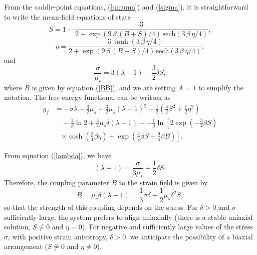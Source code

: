 \documentclass[aps,pre,reprint,amsmath,amssymbols,superscriptaddress,
nofootinbib]{revtex4-1}
\begin{document}
From the saddle-point equations, (\ref{qmumu}) and (\ref{sigma}), it is
straightforward to write the mean-field equations of state%
\begin{equation}
S=
1-\frac{3}%
{2+\exp{\left( 9 \, \beta \, (B + S) / 4 \right )} \, \text{sech}(3 \, \beta \, \eta / 4)},
\label{S}%
\end{equation}%
\begin{equation}
\eta=
\frac{3\, \tanh \left(3 \, \beta \, \eta / 4 \right)}%
{2+\exp{\left( 9 \, \beta \, (B + S) / 4 \right )} \, \text{sech} \left(3 \, \beta \, \eta / 4 \right)},
\label{eta}%
\end{equation}
and%
\begin{equation}
\frac{\sigma}{\mu_{s}}=3\left(  \lambda-1\right)  -\frac{3}{2}\delta
S,\label{lambda}%
\end{equation}
where $B$ is given by equation (\ref{BB}), and we are setting $A=1$ to
simplify the notation. The free energy functional can be written as%
\begin{align}
g_{f} & =-\sigma\lambda+\frac{3}{2}\mu_{s}+\frac{3}{2}\mu_{s}\left(
\lambda-1\right)^{2}+\frac{1}{2}\left(  \frac{3}{2}S^{2}+\frac{1}{2}\eta
^{2}\right)
\nonumber \\ & \quad
-\frac{1}{\beta}\ln2+\frac{3}{4}\mu_{s}\delta\left(
\lambda-1\right)  -
-\frac{1}{\beta}\ln\left[  2\exp\left(  -\frac{3}{4}\beta S\right)
\right. \nonumber \\ & \quad \left. \times
\cosh\left(  \frac{3}{4}\beta\eta\right)
+\exp\left(  \frac{3}{2}\beta
S+\frac{9}{4}\beta B\right)  \right]  .\label{gfgen}%
\end{align}


From equation (\ref{lambda}), we have%
\begin{equation}
\left(  \lambda-1\right)  =\frac{\sigma}{3\mu_{s}}+\frac{1}{2}\delta
S.\label{lambda2}%
\end{equation}
Therefore, the coupling parameter $B$ to the strain field is given by%
\begin{equation}
B=\mu_{s}\delta\left(  \lambda-1\right)  =\frac{1}{3}\sigma\delta+\frac{1}%
{2}\mu_{s}\delta^{2}S,\label{Bcomplete}%
\end{equation}
so that the strength of this coupling depends on the stress. For $\delta>0$
and $\sigma$ sufficiently large, the system prefers to align uniaxially (there
is a stable uniaxial solution, $S\neq0$ and $\eta=0$). For negative and
sufficiently large values of the stress $\sigma$, with positive strain
anisotropy, $\delta>0$, we anticipate the possibility of a biaxial arrangement
($S\neq0$ and $\eta\neq0$).
\end{document}
